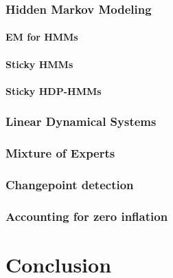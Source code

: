 \documentclass{report}
\begin{document}
\subsection{Hidden Markov Modeling}

\subsubsection{EM for HMMs}

\subsubsection{Sticky HMMs}

\subsubsection{Sticky HDP-HMMs}

\subsection{Linear Dynamical Systems}

\subsection{Mixture of Experts}

\subsection{Changepoint detection}

\subsection{Accounting for zero inflation}

\chapter{Conclusion}
\end{document}
